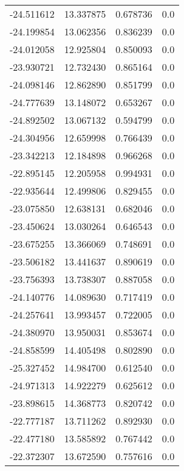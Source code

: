 \begin{tabular}{rrrr}
      -24.511612 &        13.337875 &    0.678736 &   0.0 \\
      -24.199854 &        13.062356 &    0.836239 &   0.0 \\
      -24.012058 &        12.925804 &    0.850093 &   0.0 \\
      -23.930721 &        12.732430 &    0.865164 &   0.0 \\
      -24.098146 &        12.862890 &    0.851799 &   0.0 \\
      -24.777639 &        13.148072 &    0.653267 &   0.0 \\
      -24.892502 &        13.067132 &    0.594799 &   0.0 \\
      -24.304956 &        12.659998 &    0.766439 &   0.0 \\
      -23.342213 &        12.184898 &    0.966268 &   0.0 \\
      -22.895145 &        12.205958 &    0.994931 &   0.0 \\
      -22.935644 &        12.499806 &    0.829455 &   0.0 \\
      -23.075850 &        12.638131 &    0.682046 &   0.0 \\
      -23.450624 &        13.030264 &    0.646543 &   0.0 \\
      -23.675255 &        13.366069 &    0.748691 &   0.0 \\
      -23.506182 &        13.441637 &    0.890619 &   0.0 \\
      -23.756393 &        13.738307 &    0.887058 &   0.0 \\
      -24.140776 &        14.089630 &    0.717419 &   0.0 \\
      -24.257641 &        13.993457 &    0.722005 &   0.0 \\
      -24.380970 &        13.950031 &    0.853674 &   0.0 \\
      -24.858599 &        14.405498 &    0.802890 &   0.0 \\
      -25.327452 &        14.984700 &    0.612540 &   0.0 \\
      -24.971313 &        14.922279 &    0.625612 &   0.0 \\
      -23.898615 &        14.368773 &    0.820742 &   0.0 \\
      -22.777187 &        13.711262 &    0.892930 &   0.0 \\
      -22.477180 &        13.585892 &    0.767442 &   0.0 \\
      -22.372307 &        13.672590 &    0.757616 &   0.0 \\

\end{tabular}

